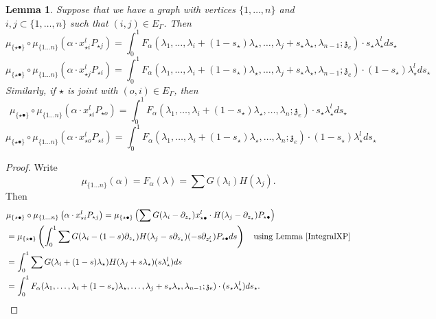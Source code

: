 \documentclass[11pt]{amsart}
\newtheorem{lem}[thm]{Lemma}
\theoremstyle{definition}
\theoremstyle{remark}
\numberwithin{equation}{section}
\begin{document}
\begin{lem}\label{IntegralS}
  Suppose that we have a graph with vertices $\{1,\dots,n\}$ and $i,j\subset \{1,\dots,n\}$ such that $(i,j)\in E_{\Gamma}$. Then
  $$
  \mu_{\{\star\bullet\}}\circ \mu_{\{1\dots n\}}\left(\alpha\cdot x^l_{\star i}P_{\star j }\right)=\int^1_0 F_{\alpha}(\lambda_1,\dots,\lambda_i+(1-s_{\star})\lambda_{\star},\dots,\lambda_j+s_{\star}\lambda_{\star},\lambda_{n-1};\mathfrak{z}_e)\cdot s_{\star}\lambda^l_{\star}ds_{\star}
  $$
    $$
  \mu_{\{\star\bullet\}}\circ \mu_{\{1\dots n\}}\left(\alpha\cdot x^l_{\star j}P_{\star i }\right)=\int^1_0 F_{\alpha}(\lambda_1,\dots,\lambda_i+(1-s_{\star})\lambda_{\star},\dots,\lambda_j+s_{\star}\lambda_{\star},\lambda_{n-1};\mathfrak{z}_e)\cdot(1-s_{\star})\lambda^l_{\star}ds_{\star}
  $$
  Similarly, if $\star$ is joint with $(o,i)\in E_{\Gamma}$, then
  $$
  \mu_{\{\star\bullet\}}\circ \mu_{\{1\dots n\}}\left(\alpha\cdot x^l_{\star i}P_{\star o }\right)=\int^1_0 F_{\alpha}(\lambda_1,\dots,\lambda_i+(1-s_{\star})\lambda_{\star},\dots,\lambda_{n};\mathfrak{z}_e)\cdot s_{\star}\lambda^l_{\star}ds_{\star}
  $$
   $$
  \mu_{\{\star\bullet\}}\circ \mu_{\{1\dots n\}}\left(\alpha\cdot x^l_{\star o}P_{\star i}\right)=\int^1_0 F_{\alpha}(\lambda_1,\dots,\lambda_i+(1-s_{\star})\lambda_{\star},\dots,\lambda_{n};\mathfrak{z}_e)\cdot(1-s_{\star})\lambda^l_{\star}ds_{\star}
  $$
\end{lem}
\begin{proof}
  Write
  $$
   \mu_{\{1\dots n\}}\left(\alpha\right)=F_{\alpha}(\lambda)=\sum G(\lambda_i)H(\lambda_j).
  $$
  Then
  \begin{align*}
   &  \mu_{\{\star\bullet\}}\circ \mu_{\{1\dots n\}}\left(\alpha\cdot x^l_{\star i}P_{\star j }\right)=  \mu_{\{\star\bullet\}}\left(\sum G(\lambda_i-\partial_{z_{\star}})x^l_{\star\bullet}\cdot H(\lambda_j-\partial_{z_{\star}})P_{\star\bullet}\right)\\
     &=\mu_{\{\star\bullet\}}\left(\int^1_0\sum G(\lambda_i-(1-s)\partial_{z_{\star}}) H(\lambda_j-s\partial_{z_{\star}})(-s\partial_{z^l_{\star}})P_{\star\bullet}ds\right)\quad \text{using Lemma \ref{IntegralXP}}\\
     &=\int^1_0\sum G(\lambda_i+(1-s)\lambda_{\star}) H(\lambda_j+s\lambda_{\star})(s\lambda^l_{\star})ds\\
     &=\int^1_0 F_{\alpha}(\lambda_1,\dots,\lambda_i+(1-s_{\star})\lambda_{\star},\dots,\lambda_j+s_{\star}\lambda_{\star},\lambda_{n-1};\mathfrak{z}_e)\cdot(s_{\star}\lambda^l_{\star})ds_{\star}.
  \end{align*}
\end{proof}
\end{document}
